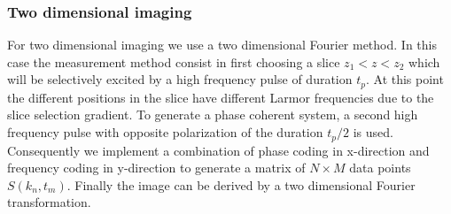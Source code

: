 \subsubsection{Two dimensional imaging}
For two dimensional imaging we use a two dimensional Fourier method. In this case the measurement method consist in first choosing a slice $z_1 < z < z_2$ which will be selectively excited by a high frequency pulse of duration $t_p$. At this point the different positions in the slice have different Larmor frequencies due to the slice selection gradient. To generate a phase coherent system, a second high frequency pulse with opposite polarization of the duration $t_p/2$ is used. Consequently we implement a combination of phase coding in x-direction and frequency coding in y-direction to generate a matrix of $N\times M$ data points $S(k_n, t_m)$. Finally the image can be derived by a two dimensional Fourier transformation. 













